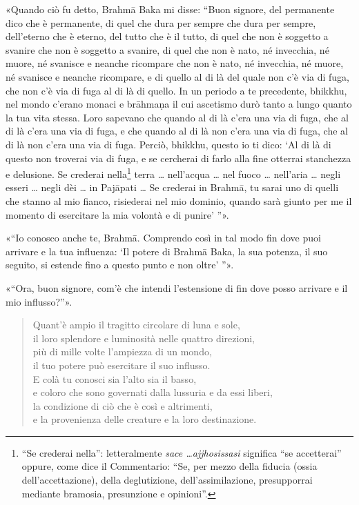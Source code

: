 «Quando ciò fu detto, Brahmā Baka mi disse: “Buon signore, del
permanente dico che è permanente, di quel che dura per sempre che dura
per sempre, dell’eterno che è eterno, del tutto che è il tutto, di quel
che non è soggetto a svanire che non è soggetto a svanire, di quel che
non è nato, né invecchia, né muore, né svanisce e neanche ricompare che
non è nato, né invecchia, né muore, né svanisce e neanche ricompare, e
di quello al di là del quale non c’è via di fuga, che non c’è via di
fuga al di là di quello. In un periodo a te precedente, bhikkhu, nel
mondo c’erano monaci e brāhmaṇa il cui ascetismo durò tanto a lungo
quanto la tua vita stessa. Loro sapevano che quando al di là c’era una
via di fuga, che al di là c’era una via di fuga, e che quando al di là
non c’era una via di fuga, che al di là non c’era una via di fuga.
Perciò, bhikkhu, questo io ti dico: ‘Al di là di questo non troverai via
di fuga, e se cercherai di farlo alla fine otterrai stanchezza e
delusione. Se crederai nella\footnote{“Se crederai nella”: letteralmente \emph{sace …​ ajjhosissasi} significa “se accetterai” oppure, come dice il Commentario: “Se, per mezzo della fiducia (ossia dell’accettazione), della deglutizione, dell’assimilazione, presupporrai mediante bramosia, presunzione e opinioni”.} terra … nell’acqua … nel
fuoco … nell’aria … negli esseri … negli dèi … in Pajāpati … Se crederai
in Brahmā, tu sarai uno di quelli che stanno al mio fianco, risiederai
nel mio dominio, quando sarà giunto per me il momento di esercitare la
mia volontà e di punire’ ”».


«“Io conosco anche te, Brahmā. Comprendo così in tal modo fin dove puoi
arrivare e la tua influenza: ‘Il potere di Brahmā Baka, la sua potenza,
il suo seguito, si estende fino a questo punto e non oltre’ ”».


«“Ora, buon signore, com’è che intendi l’estensione di fin dove posso
arrivare e il mio influsso?”».


\begin{quotation}
Quant’è ampio il tragitto circolare di luna e sole, \\
il loro splendore e luminosità nelle quattro direzioni, \\
più di mille volte l’ampiezza di un mondo, \\
il tuo potere può esercitare il suo influsso. \\
E colà tu conosci sia l’alto sia il basso, \\
e coloro che sono governati dalla lussuria e da essi liberi, \\
la condizione di ciò che è così e altrimenti, \\
e la provenienza delle creature e la loro destinazione.
\end{quotation}

